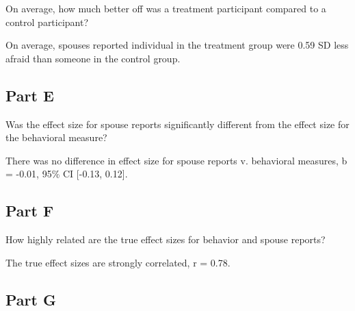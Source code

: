 \documentclass[]{article}
\newenvironment{Shaded}{\begin{snugshade}}{\end{snugshade}}
\newcommand{\KeywordTok}[1]{\textcolor[rgb]{0.13,0.29,0.53}{\textbf{#1}}}
\newcommand{\DataTypeTok}[1]{\textcolor[rgb]{0.13,0.29,0.53}{#1}}
\newcommand{\DecValTok}[1]{\textcolor[rgb]{0.00,0.00,0.81}{#1}}
\newcommand{\StringTok}[1]{\textcolor[rgb]{0.31,0.60,0.02}{#1}}
\newcommand{\OperatorTok}[1]{\textcolor[rgb]{0.81,0.36,0.00}{\textbf{#1}}}
\newcommand{\NormalTok}[1]{#1}
\begin{document}
On average, how much better off was a treatment participant compared to
a control participant?

On average, spouses reported individual in the treatment group were 0.59
SD less afraid than someone in the control group.

\subsection{Part E}\label{part-e}

Was the effect size for spouse reports significantly different from the
effect size for the behavioral measure?

\begin{Shaded}
\end{Shaded}

There was no difference in effect size for spouse reports v. behavioral
measures, b = -0.01, 95\% CI {[}-0.13, 0.12{]}.

\subsection{Part F}\label{part-f}

How highly related are the true effect sizes for behavior and spouse
reports?

The true effect sizes are strongly correlated, r = 0.78.

\subsection{Part G}\label{part-g}
\end{document}
